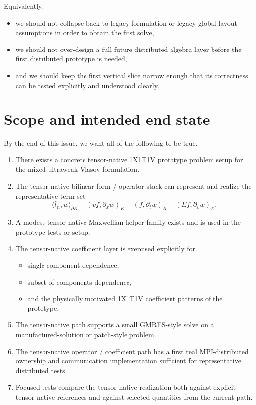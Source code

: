 \documentclass[11pt]{article}
\begin{document}
Equivalently:
\begin{itemize}[leftmargin=2em]
\item we should not collapse back to legacy formulation or legacy global-layout assumptions in order to obtain the first solve,
\item we should not over-design a full future distributed algebra layer before the first distributed prototype is needed,
\item and we should keep the first vertical slice narrow enough that its correctness can be tested explicitly and understood clearly.
\end{itemize}

\section{Scope and intended end state}

By the end of this issue, we want all of the following to be true.

\begin{enumerate}[leftmargin=2em]
\item There exists a concrete tensor-native 1X1T1V prototype problem setup for the mixed ultraweak Vlasov formulation.

\item The tensor-native bilinear-form / operator stack can represent and realize the representative term set
\[
\langle \widehat{t}_n, w \rangle_{\partial K}
-
(v f, \partial_x w)_K
-
(f, \partial_t w)_K
-
(E f, \partial_v w)_K.
\]

\item A modest tensor-native Maxwellian helper family exists and is used in the prototype tests or setup.

\item The tensor-native coefficient layer is exercised explicitly for
\begin{itemize}[leftmargin=2em]
\item single-component dependence,
\item subset-of-components dependence,
\item and the physically motivated 1X1T1V coefficient patterns of the prototype.
\end{itemize}

\item The tensor-native path supports a small GMRES-style solve on a manufactured-solution or patch-style problem.

\item The tensor-native operator / coefficient path has a first real MPI-distributed ownership and communication implementation sufficient for representative distributed tests.

\item Focused tests compare the tensor-native realization both against explicit tensor-native references and against selected quantities from the current path.
\end{enumerate}
\end{document}
